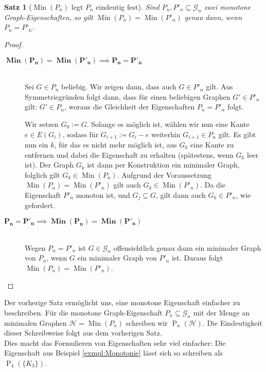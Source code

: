 \documentclass[10pt,a4paper, footheight=1mm]{scrreprt}
\newtheorem{Satz}[definition]{Satz}
\theoremstyle{definition}
\DeclareMathOperator\Min{Min}
\begin{document}
\begin{Satz}[$\Min(P_n)$ legt $P_n$ eindeutig fest]
Sind $P_n, P'_n \subseteq \mathcal{G}_n$ zwei monotone 
Graph-Eigenschaften, so gilt
$\Min(P_n) = \Min(P'_n)$ genau dann, wenn $P_n = P'_n$.
\end{Satz}
\begin{proof} \hfill
\vspace*{-3mm}
\begin{description}
\item[$\boldsymbol{\Min(P_n) = \Min(P'_n) \implies P_n = P'_n}$]
\hfill \\
Sei $G \in P_n$ beliebig. Wir zeigen dann, dass auch $G \in P'_n$
gilt. Aus Symmetriegründen folgt dann, dass für einen  beliebigen
Graphen $G' \in P'_n$ gilt: $G' \in P_n$, woraus die Gleichheit der
Eigenschaften $P_n = P'_n$ folgt.

Wir setzen $G_0 := G$. Solange es möglich ist, wählen wir nun
eine Kante $e \in E(G_i)$, sodass für $G_{i+1} := G_i - e$  
weiterhin $G_{i+1} \in P_n$ gilt.
Es gibt nun ein $k$, für das es nicht mehr möglich ist,
aus $G_k$ eine Kante zu entfernen und dabei die Eigenschaft
zu erhalten (spätestens, wenn $G_k$ leer ist).
Der Graph $G_k$ ist dann per Konstruktion ein minimaler
Graph, folglich gilt $G_k \in \Min(P_n)$. Aufgrund der
Voraussetzung $\Min(P_n) = \Min(P'_n)$ gilt auch 
$G_k \in \Min(P'_n)$. Da die Eigenschaft $P'_n$ monoton ist,
und $G_j \subseteq G$, gilt dann auch $G_k \in P'_n$,
wie gefordert.
\vspace*{-2mm}
\item[$\boldsymbol{P_n = P'_n \implies \Min(P_n) = \Min(P'_n)}$]
\hfill \\
Wegen $P_n = P'_n$ ist $G \in \mathcal{G}_n$ offensichtlich
genau dann ein minimaler Graph von $P_n$, wenn $G$ ein 
minimaler Graph von $P'_n$ ist. Daraus folgt 
$\Min(P_n) = \Min(P'_n)$. \qedhere
\end{description}
\end{proof}
Der vorherige Satz ermöglicht uns, eine
monotone Eigenschaft einfacher zu beschreiben. 
Für die monotone Graph-Eigenschaft $P_n\subseteq \mathcal{G}_n$
mit der Menge an minimalen Graphen $\mathcal{H} = \Min(P_n)$
schreiben wir $\operatorname{P}_n(\mathcal{H})$. Die Eindeutigkeit dieser
Schreibweise folgt aus dem vorherigen Satz. \\
Dies macht das Formulieren von Eigenschaften sehr viel einfacher:
Die Eigenschaft aus Beispiel \ref{exmpl:Monotonie} lässt sich
so schreiben als $\operatorname{P}_4(\{K_3\})$.
\end{document}
